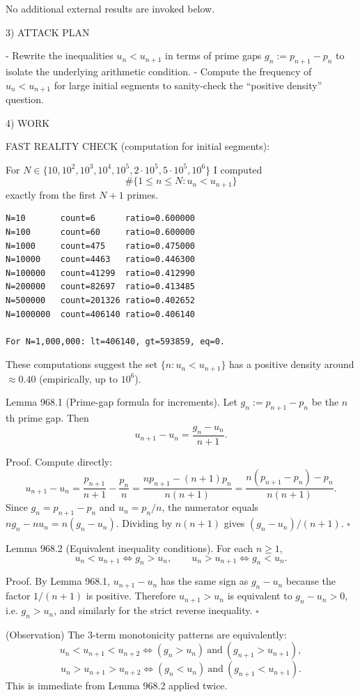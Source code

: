 No additional external results are invoked below.

3) ATTACK PLAN

- Rewrite the inequalities $u_n<u_{n+1}$ in terms of prime gaps $g_n:=p_{n+1}-p_n$ to isolate the underlying arithmetic condition.
- Compute the frequency of $u_n<u_{n+1}$ for large initial segments to sanity-check the “positive density” question.

4) WORK

FAST REALITY CHECK (computation for initial segments):

For $N\in\{10,10^2,10^3,10^4,10^5,2\cdot 10^5,5\cdot 10^5,10^6\}$ I computed
\[
\#\{1\le n\le N: u_n<u_{n+1}\}
\]
exactly from the first $N+1$ primes.

\begin{verbatim}
N=10       count=6      ratio=0.600000
N=100      count=60     ratio=0.600000
N=1000     count=475    ratio=0.475000
N=10000    count=4463   ratio=0.446300
N=100000   count=41299  ratio=0.412990
N=200000   count=82697  ratio=0.413485
N=500000   count=201326 ratio=0.402652
N=1000000  count=406140 ratio=0.406140

For N=1,000,000: lt=406140, gt=593859, eq=0.
\end{verbatim}

These computations suggest the set $\{n:u_n<u_{n+1}\}$ has a positive density around $\approx 0.40$ (empirically, up to $10^6$).

Lemma 968.1 (Prime-gap formula for increments).
Let $g_n:=p_{n+1}-p_n$ be the $n$th prime gap. Then
\[
 u_{n+1}-u_n = \frac{g_n-u_n}{n+1}.
\]

Proof.
Compute directly:
\[
 u_{n+1}-u_n = \frac{p_{n+1}}{n+1}-\frac{p_n}{n}
=\frac{n p_{n+1}-(n+1)p_n}{n(n+1)}
=\frac{n(p_{n+1}-p_n)-p_n}{n(n+1)}.
\]
Since $g_n=p_{n+1}-p_n$ and $u_n=p_n/n$, the numerator equals $n g_n - n u_n = n(g_n-u_n)$. Dividing by $n(n+1)$ gives $(g_n-u_n)/(n+1)$. $\square$

Lemma 968.2 (Equivalent inequality conditions).
For each $n\ge 1$,
\[
 u_n<u_{n+1}\iff g_n>u_n,
\qquad
 u_n>u_{n+1}\iff g_n<u_n.
\]

Proof.
By Lemma 968.1, $u_{n+1}-u_n$ has the same sign as $g_n-u_n$ because the factor $1/(n+1)$ is positive. Therefore $u_{n+1}>u_n$ is equivalent to $g_n-u_n>0$, i.e. $g_n>u_n$, and similarly for the strict reverse inequality. $\square$

(Observation) The 3-term monotonicity patterns are equivalently:
\[
 u_n<u_{n+1}<u_{n+2}\iff (g_n>u_n)\ \text{and}\ (g_{n+1}>u_{n+1}),
\]
\[
 u_n>u_{n+1}>u_{n+2}\iff (g_n<u_n)\ \text{and}\ (g_{n+1}<u_{n+1}).
\]
This is immediate from Lemma 968.2 applied twice.

